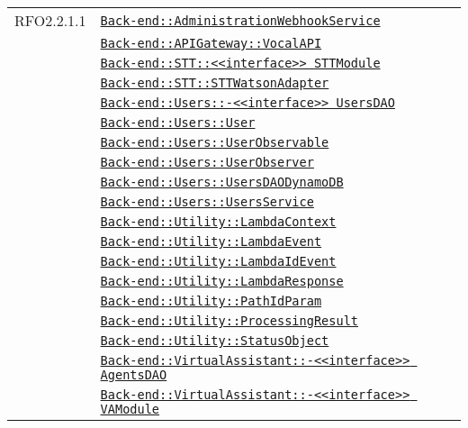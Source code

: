 \begin{longtable}{|>{\centering}m{3cm}|m{10cm}<{\centering}|}
RFO2.2.1.1 & \hyperref[Back-end::AdministrationWebhookService]{\texttt{Back-end::AdministrationWebhookService}}\\
& \hyperref[Back-end::APIGateway::VocalAPI]{\texttt{Back-end::APIGateway::VocalAPI}}\\
& \hyperref[Back-end::STT::<<interface>> STTModule]{\texttt{Back-end::STT::<<interface>> STTModule}}\\
& \hyperref[Back-end::STT::STTWatsonAdapter]{\texttt{Back-end::STT::STTWatsonAdapter}}\\
& \hyperref[Back-end::Users::<<interface>> UsersDAO]{\texttt{Back-end::Users::-\linebreak <<interface>> UsersDAO}}\\
& \hyperref[Back-end::Users::User]{\texttt{Back-end::Users::User}}\\
& \hyperref[Back-end::Users::UserObservable]{\texttt{Back-end::Users::UserObservable}}\\
& \hyperref[Back-end::Users::UserObserver]{\texttt{Back-end::Users::UserObserver}}\\
& \hyperref[Back-end::Users::UsersDAODynamoDB]{\texttt{Back-end::Users::UsersDAODynamoDB}}\\
& \hyperref[Back-end::Users::UsersService]{\texttt{Back-end::Users::UsersService}}\\
& \hyperref[Back-end::Utility::LambdaContext]{\texttt{Back-end::Utility::LambdaContext}}\\
& \hyperref[Back-end::Utility::LambdaEvent]{\texttt{Back-end::Utility::LambdaEvent}}\\
& \hyperref[Back-end::Utility::LambdaIdEvent]{\texttt{Back-end::Utility::LambdaIdEvent}}\\
& \hyperref[Back-end::Utility::LambdaResponse]{\texttt{Back-end::Utility::LambdaResponse}}\\
& \hyperref[Back-end::Utility::PathIdParam]{\texttt{Back-end::Utility::PathIdParam}}\\
& \hyperref[Back-end::Utility::ProcessingResult]{\texttt{Back-end::Utility::ProcessingResult}}\\
& \hyperref[Back-end::Utility::StatusObject]{\texttt{Back-end::Utility::StatusObject}}\\
& \hyperref[Back-end::VirtualAssistant::<<interface>> AgentsDAO]{\texttt{Back-end::VirtualAssistant::-\linebreak <<interface>> AgentsDAO}}\\
& \hyperref[Back-end::VirtualAssistant::<<interface>> VAModule]{\texttt{Back-end::VirtualAssistant::-\linebreak <<interface>> VAModule}}\\

\end{longtable}
